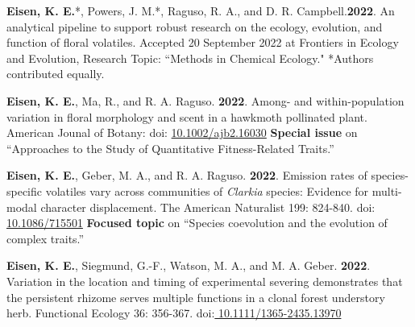\documentclass[letterpaper,11pt]{article}
\begin{document}
\begin{etaremune}
\item \textbf{Eisen, K. E.}*, Powers, J. M.*, Raguso, R. A., and D. R. Campbell.\textbf{2022}. An analytical pipeline to support robust research on the ecology, evolution, and function of floral volatiles. Accepted 20 September 2022 at Frontiers in Ecology and Evolution, Research Topic: ``Methods in Chemical Ecology." *Authors contributed equally.\\

\item\textbf{Eisen, K. E.}, Ma, R., and R. A. Raguso. \textbf{2022}.  Among- and within-population variation in floral morphology and scent in a hawkmoth pollinated plant. American Jounal of Botany: doi: \href{https://doi.org/10.1002/ajb2.16030}{10.1002/ajb2.16030}
\textbf{Special issue} on ``Approaches to the Study of Quantitative Fitness-Related Traits.''\\

\item \textbf{Eisen, K. E.}, Geber, M. A., and R. A. Raguso. \textbf{2022}. Emission rates of species-specific volatiles vary across communities of \textit{Clarkia} species: Evidence for multi-modal character displacement. The American Naturalist 199: 824-840. doi: \href{https://doi.org/10.1086/715501}{10.1086/715501} \textbf{Focused topic} on ``Species coevolution and the evolution of complex traits.''\\

\item \textbf{Eisen, K. E.}, Siegmund, G.-F., Watson, M. A., and M. A. Geber. \textbf{2022}. Variation in the location and timing of experimental severing demonstrates that the persistent rhizome serves multiple functions in a clonal forest understory herb. Functional Ecology 36: 356-367. doi:\href{https://doi.org/10.1111/1365-2435.13970}{ 10.1111/1365-2435.13970}\\


\end{etaremune}
\end{document}
